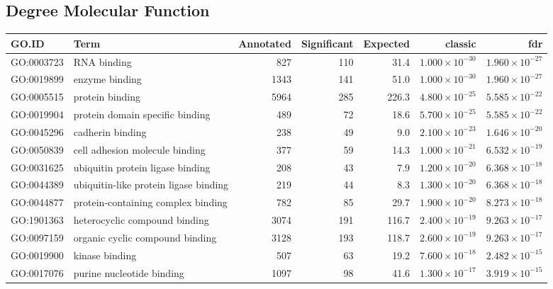 \subsection{Degree Molecular Function}
\begin{table}[ht]
\centering
\begin{adjustbox}{max width=\textwidth}
\begin{tabular}{llrrrrr}
  \hline
GO.ID & Term & Annotated & Significant & Expected & classic & fdr \\ 
  \hline
GO:0003723 & RNA binding & 827 & 110 & 31.4 & $1.000 \times 10^{-30}$ & $1.960 \times 10^{-27}$ \\ 
  GO:0019899 & enzyme binding & 1343 & 141 & 51.0 & $1.000 \times 10^{-30}$ & $1.960 \times 10^{-27}$ \\ 
  GO:0005515 & protein binding & 5964 & 285 & 226.3 & $4.800 \times 10^{-25}$ & $5.585 \times 10^{-22}$ \\ 
  GO:0019904 & protein domain specific binding & 489 & 72 & 18.6 & $5.700 \times 10^{-25}$ & $5.585 \times 10^{-22}$ \\ 
  GO:0045296 & cadherin binding & 238 & 49 & 9.0 & $2.100 \times 10^{-23}$ & $1.646 \times 10^{-20}$ \\ 
  GO:0050839 & cell adhesion molecule binding & 377 & 59 & 14.3 & $1.000 \times 10^{-21}$ & $6.532 \times 10^{-19}$ \\ 
  GO:0031625 & ubiquitin protein ligase binding & 208 & 43 & 7.9 & $1.200 \times 10^{-20}$ & $6.368 \times 10^{-18}$ \\ 
  GO:0044389 & ubiquitin-like protein ligase binding & 219 & 44 & 8.3 & $1.300 \times 10^{-20}$ & $6.368 \times 10^{-18}$ \\ 
  GO:0044877 & protein-containing complex binding & 782 & 85 & 29.7 & $1.900 \times 10^{-20}$ & $8.273 \times 10^{-18}$ \\ 
  GO:1901363 & heterocyclic compound binding & 3074 & 191 & 116.7 & $2.400 \times 10^{-19}$ & $9.263 \times 10^{-17}$ \\ 
  GO:0097159 & organic cyclic compound binding & 3128 & 193 & 118.7 & $2.600 \times 10^{-19}$ & $9.263 \times 10^{-17}$ \\ 
  GO:0019900 & kinase binding & 507 & 63 & 19.2 & $7.600 \times 10^{-18}$ & $2.482 \times 10^{-15}$ \\ 
  GO:0017076 & purine nucleotide binding & 1097 & 98 & 41.6 & $1.300 \times 10^{-17}$ & $3.919 \times 10^{-15}$ \\ 

\end{tabular}
\end{adjustbox}
\end{table}

